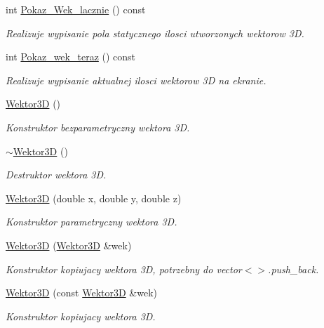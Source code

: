 \begin{DoxyCompactItemize}
\item 
int \hyperlink{class_wektor3_d_adaa56ab5d4c5a31d3e42909b2f3a07af}{Pokaz\+\_\+\+Wek\+\_\+lacznie} () const
\begin{DoxyCompactList}\small\item\em Realizuje wypisanie pola statycznego ilosci utworzonych wektorow 3D. \end{DoxyCompactList}\item 
int \hyperlink{class_wektor3_d_a1790e3cb0d7ab755639e901c3065831a}{Pokaz\+\_\+wek\+\_\+teraz} () const
\begin{DoxyCompactList}\small\item\em Realizuje wypisanie aktualnej ilosci wektorow 3D na ekranie. \end{DoxyCompactList}\item 
\hyperlink{class_wektor3_d_a7c48a57fd36c0af29e26c825f90a973f}{Wektor3D} ()
\begin{DoxyCompactList}\small\item\em Konstruktor bezparametryczny wektora 3D. \end{DoxyCompactList}\item 
\hyperlink{class_wektor3_d_af82ae24a30f6c4391edd67647348ac04}{$\sim$\+Wektor3D} ()
\begin{DoxyCompactList}\small\item\em Destruktor wektora 3D. \end{DoxyCompactList}\item 
\hyperlink{class_wektor3_d_a0defc77d38b1c9f9b1063d2b3459de5c}{Wektor3D} (double x, double y, double z)
\begin{DoxyCompactList}\small\item\em Konstruktor parametryczny wektora 3D. \end{DoxyCompactList}\item 
\hyperlink{class_wektor3_d_aadf1182f4aad14b9e58eda2dee7e9072}{Wektor3D} (\hyperlink{class_wektor3_d}{Wektor3D} \&wek)
\begin{DoxyCompactList}\small\item\em Konstruktor kopiujacy wektora 3D, potrzebny do vector$<$$>$.\+push\+\_\+back. \end{DoxyCompactList}\item 
\hyperlink{class_wektor3_d_a9541f7f55cdf5e8db8c811b65550c3c4}{Wektor3D} (const \hyperlink{class_wektor3_d}{Wektor3D} \&wek)
\begin{DoxyCompactList}\small\item\em Konstruktor kopiujacy wektora 3D. \end{DoxyCompactList}\item 

\end{DoxyCompactItemize}
